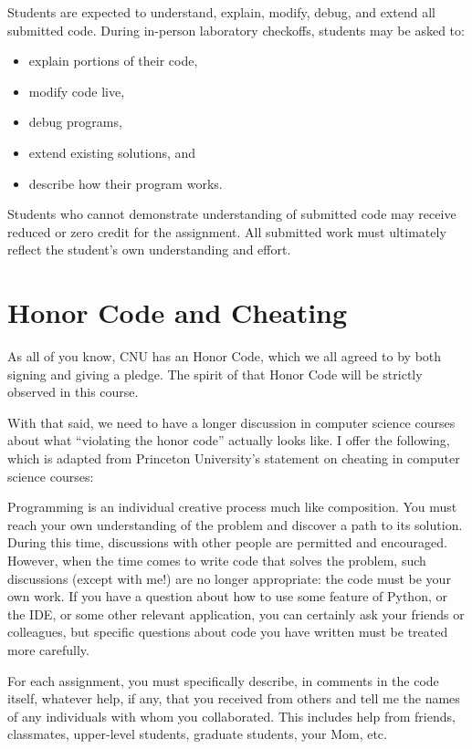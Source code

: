 \documentclass[11pt]{article}
\begin{document}
Students are expected to understand, explain, modify, debug, and extend all submitted code. During in-person laboratory checkoffs, students may be asked to:

\begin{itemize}[itemsep=0.2em]
    \item explain portions of their code,
    \item modify code live,
    \item debug programs,
    \item extend existing solutions, and
    \item describe how their program works.
\end{itemize}

Students who cannot demonstrate understanding of submitted code may receive reduced or zero credit for the assignment. All submitted work must ultimately reflect the student's own understanding and effort.

\section{Honor Code and Cheating}

As all of you know, CNU has an Honor Code, which we all agreed to by both signing and giving a pledge. The spirit of that Honor Code will be strictly observed in this course.

With that said, we need to have a longer discussion in computer science courses about what ``violating the honor code'' actually looks like. I offer the following, which is adapted from Princeton University's statement on cheating in computer science courses:

Programming is an individual creative process much like composition. You must reach your own understanding of the problem and discover a path to its solution. During this time, discussions with other people are permitted and encouraged. However, when the time comes to write code that solves the problem, such discussions (except with me!) are no longer appropriate: the code must be your own work. If you have a question about how to use some feature of Python, or the IDE, or some other relevant application, you can certainly ask your friends or colleagues, but specific questions about code you have written must be treated more carefully.

For each assignment, you must specifically describe, in comments in the code itself, whatever help, if any, that you received from others and tell me the names of any individuals with whom you collaborated. This includes help from friends, classmates, upper-level students, graduate students, your Mom, etc.
\end{document}
